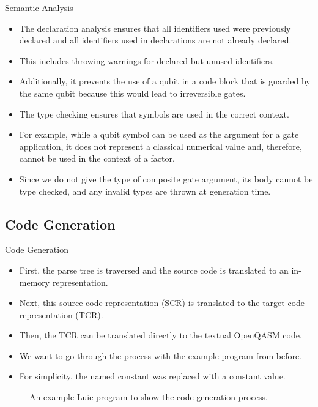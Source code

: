 \begin{frame}{Semantic Analysis}
    \begin{itemize}
        \item The declaration analysis ensures that all identifiers used were previously declared and all identifiers used in declarations are not already declared.
        \item This includes throwing warnings for declared but unused identifiers.
        \item Additionally, it prevents the use of a qubit in a code block that is guarded by the same qubit because this would lead to irreversible gates.
        \item The type checking ensures that symbols are used in the correct context.
        \item For example, while a qubit symbol can be used as the argument for a gate application, it does not represent a classical numerical value and, therefore, cannot be used in the context of a factor.
        \item Since we do not give the type of composite gate argument, its body cannot be type checked, and any invalid types are thrown at generation time. 
    \end{itemize}
\end{frame}

\subsection{Code Generation}
\begin{frame}{Code Generation}
    \begin{itemize}
        \item First, the parse tree is traversed and the source code is translated to an in-memory representation.
        \item Next, this source code representation (SCR) is translated to the target code representation (TCR).
        \item Then, the TCR can be translated directly to the textual OpenQASM code.
        \item We want to go through the process with the example program from before.
        \item For simplicity, the named constant was replaced with a constant value.
    \end{itemize}
    \begin{figure}
        \centering
        
        \caption{An example Luie program to show the code generation process.}
    \end{figure}
\end{frame}

